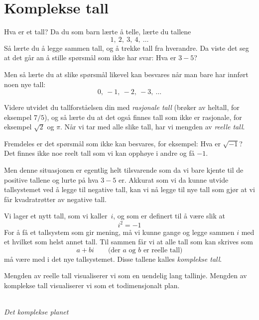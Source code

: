 \section*{Komplekse tall}

Hva er et tall?  Da du som barn lærte å telle, lærte du tallene
\[
1,\ 2,\ 3,\ 4,\ \ldots
\]
Så lærte du å legge sammen tall, og å trekke tall fra hverandre.  Da
viste det seg at det går an å stille spørsmål som ikke har svar: Hva
er $3 - 5$?

Men så lærte du at slike spørsmål likevel kan besvares når man bare
har innført noen nye tall:
\[
0,\ -1,\ -2,\ -3,\ \ldots
\]

Videre utvidet du tallforståelsen din med \emph{rasjonale tall}
(brøker av heltall, for eksempel $7/5$), og så lærte du at det også
finnes tall som ikke er rasjonale, for eksempel $\sqrt{2}$ og $\pi$.
Når vi tar med alle slike tall, har vi mengden av \emph{reelle tall}.

Fremdeles er det spørsmål som ikke kan besvares, for eksempel: Hva er
$\sqrt{-1}$?  Det finnes ikke noe reelt tall som vi kan opphøye i
andre og få $-1$.

Men denne situasjonen er egentlig helt tilsvarende som da vi bare
kjente til de positive tallene og lurte på hva $3 - 5$ er.  Akkurat
som vi da kunne utvide tallsystemet ved å legge til negative tall, kan
vi nå legge til nye tall som gjør at vi får kvadratrøtter av negative
tall.

Vi lager et nytt tall, som vi kaller~$i$, og som er definert til å
være slik at
\[
i^2 = -1
\]
For å få et tallsystem som gir mening, må vi kunne gange og legge
sammen $i$ med et hvilket som helst annet tall.  Til sammen får vi at
alle tall som kan skrives som
\[
a + bi
\qquad
\text{(der $a$ og~$b$ er reelle tall)}
\]
må være med i det nye tallsystemet.  Disse tallene kalles
\emph{komplekse tall}.

Mengden av reelle tall visualiserer vi som en uendelig lang tallinje.
Mengden av komplekse tall visualiserer vi som et todimensjonalt plan.
\begin{center}
\\
{\small\it Det komplekse planet}
\end{center}

